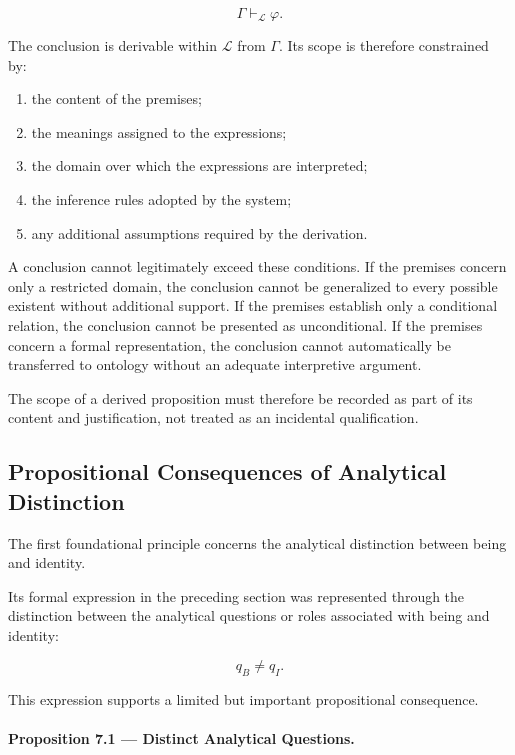\[
    \Gamma \vdash_{\mathcal{L}} \varphi.
\]

The conclusion is derivable within \(\mathcal{L}\) from
\(\Gamma\). Its scope is therefore constrained by:

\begin{enumerate}
    \item the content of the premises;
    \item the meanings assigned to the expressions;
    \item the domain over which the expressions are interpreted;
    \item the inference rules adopted by the system;
    \item any additional assumptions required by the derivation.
\end{enumerate}

A conclusion cannot legitimately exceed these conditions.
If the premises concern only a restricted domain, the conclusion
cannot be generalized to every possible existent without
additional support. If the premises establish only a conditional
relation, the conclusion cannot be presented as unconditional.
If the premises concern a formal representation, the conclusion
cannot automatically be transferred to ontology without an
adequate interpretive argument.

The scope of a derived proposition must therefore be recorded
as part of its content and justification, not treated as an
incidental qualification.

\subsection{Propositional Consequences of Analytical Distinction}

The first foundational principle concerns the analytical
distinction between being and identity.

Its formal expression in the preceding section was represented
through the distinction between the analytical questions or
roles associated with being and identity:

\[
    q_B \neq q_I.
\]

This expression supports a limited but important propositional
consequence.

\paragraph{Proposition 7.1 — Distinct Analytical Questions.}

